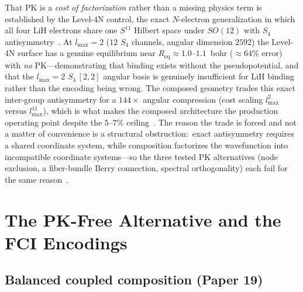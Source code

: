 \documentclass[aps,pra,twocolumn,superscriptaddress,longbibliography]{revtex4-2}
\begin{document}
That PK is a \emph{cost of factorization} rather than a missing physics
term is established by the Level-4N control, the exact $N$-electron
generalization in which all four LiH electrons share one
$S^{11}$ Hilbert space under $SO(12)$ with $S_4$
antisymmetry~\cite{loutey_paper17}.  At $l_{\max}=2$ ($12$ $S_4$
channels, angular dimension $2592$) the Level-4N surface has a genuine
equilibrium near $R_{\mathrm{eq}} \approx 1.0$--$1.1$~bohr ($\approx
64\%$ error) with \emph{no} PK---demonstrating that binding exists
without the pseudopotential, and that the $l_{\max}=2$ $S_4\,[2,2]$
angular basis is genuinely insufficient for LiH binding rather than the
encoding being wrong.  The composed geometry trades this exact
inter-group antisymmetry for a $144\times$ angular compression (cost
scaling $l_{\max}^2$ versus $l_{\max}^{11}$), which is what makes the
composed architecture the production operating point despite the
$5$--$7\%$ ceiling~\cite{loutey_paper17}.  The reason the trade is
forced and not a matter of convenience is a structural obstruction:\
exact antisymmetry requires a shared coordinate system, while
composition factorizes the wavefunction into incompatible coordinate
systems---so the three tested PK alternatives (node exclusion, a
fiber-bundle Berry connection, spectral orthogonality) each fail for the
same reason~\cite{loutey_paper17}.

\section{The PK-Free Alternative and the FCI Encodings}
\label{sec:pkfree_fci}

\subsection{Balanced coupled composition (Paper 19)}
\end{document}
